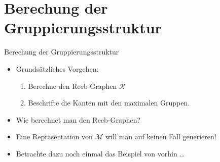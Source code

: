 \documentclass[
wide,
10pt,
xcolor={x11names,svgnames},
hyperref={pdfauthor={Jannes Bantje},colorlinks,urlcolor=maincolor,hidelinks=false,linkcolor=maincolor},
pantone312, 	%
euler-digits,
]{beamer}
\theoremstyle{definition}
\begin{document}
\section{Berechung der Gruppierungsstruktur}
\label{sec:Berechung der Gruppierungsstruktur}

\begin{frame}{Berechung der Gruppierungsstruktur}
    \begin{itemize}
        \item Grundsätzliches Vorgehen:
        \begin{enumerate}
            \item Berechne den Reeb-Graphen $\mathcal{R}$
            \item Beschrifte die Kanten mit den maximalen Gruppen.
        \end{enumerate}
        \item Wie berechnet man den Reeb-Graphen?
        \item Eine Repräsentation von $\mathcal{M}$ will man auf keinen Fall generieren!
        \item Betrachte dazu noch einmal das Beispiel von vorhin \ldots
    \end{itemize}
\end{frame}
\end{document}
